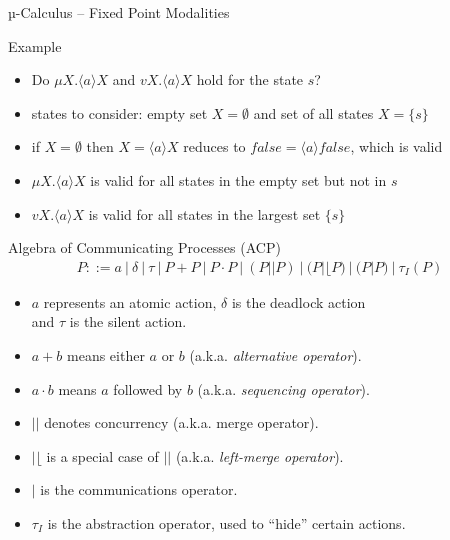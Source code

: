 \documentclass[aspectratio=1610]{beamer}
\begin{document}
  \begin{frame}{µ-Calculus – Fixed Point Modalities}
    \begin{exampleblock}{Example}
      \begin{center}
      \end{center}
      \begin{itemize}
        \item Do $\mu X. \langle a \rangle X$ and $vX. \langle a \rangle X$ hold for the state $s$?
        \item states to consider: empty set $X = \emptyset$ and set of all states $X = \{s\}$
        \item if $X = \emptyset$ then $X = \langle a \rangle X$ reduces to $false = \langle a \rangle false$, which is valid
        \item $\mu X. \langle a \rangle X$ is valid for all states in the empty set but not in $s$
        \item $vX. \langle a \rangle X$ is valid for all states in the largest set $\{s\}$
      \end{itemize}
    \end{exampleblock}
  \end{frame}


  \begin{frame}{Algebra of Communicating Processes (ACP)}
    \begin{align*}
      P ::= a\ |\ \delta\ |\ \tau\ |\ P + P\ |\ P \cdot P\ |\ (P || P)\ |\ (P |\lfloor P)\ |\ (P | P)\ |\ \tau_I(P)
    \end{align*}

    \begin{itemize}
      \item $a$ represents an atomic action, $\delta$ is the deadlock action \\ and $\tau$ is the silent action.
      \item $a + b$ means either $a$ or $b$ (a.k.a. \textit{alternative operator}).
      \item $a \cdot b$ means $a$ followed by $b$ (a.k.a. \textit{sequencing operator}).
      \item $||$ denotes concurrency (a.k.a. merge operator).
      \item $|\lfloor$ is a special case of $||$ (a.k.a. \textit{left-merge operator}).
      \item $|$ is the communications operator.
      \item $\tau_I$ is the abstraction operator, used to “hide” certain actions.
    \end{itemize}
  \end{frame}
\end{document}
